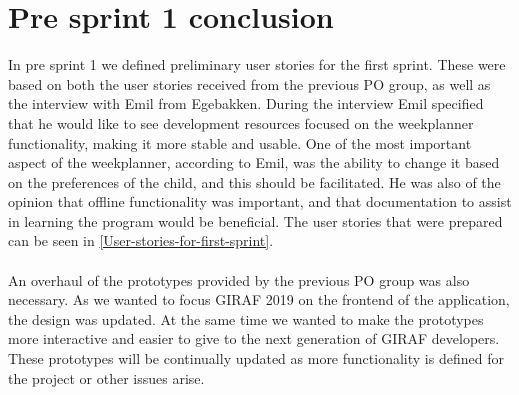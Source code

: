 \section{Pre sprint 1 conclusion}
In pre sprint 1 we defined preliminary user stories for the first sprint.
These were based on both the user stories received from the previous PO group, as well as the interview with Emil from Egebakken.
During the interview Emil specified that he would like to see development resources focused on the weekplanner functionality, making it more stable and usable.
One of the most important aspect of the weekplanner, according to Emil, was the ability to change it based on the preferences of the child, and this should be facilitated.
He was also of the opinion that offline functionality was important, and that documentation to assist in learning the program would be beneficial.
The user stories that were prepared can be seen in \autoref{User-stories-for-first-sprint}.
\\\\
An overhaul of the prototypes provided by the previous PO group was also necessary.
As we wanted to focus GIRAF 2019 on the frontend of the application, the design was updated.
At the same time we wanted to make the prototypes more interactive and easier to give to the next generation of GIRAF developers.
These prototypes will be continually updated as more functionality is defined for the project or other issues arise. 